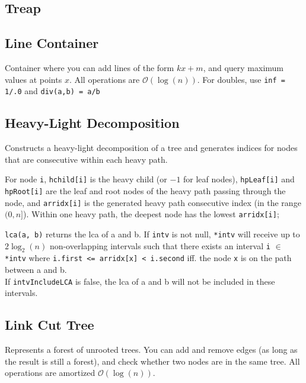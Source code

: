 \documentclass{article}
\begin{document}
\subsection*{Treap}


\subsection*{Line Container}
Container where you can add lines of the form $kx + m$, and query maximum values at points $x$.
All operations are $\mathcal{O}(\log(n))$. For doubles, use \lstinline{inf = 1/.0} and \lstinline{div(a,b) = a/b}


\newpage

\subsection*{Heavy-Light Decomposition}
Constructs a heavy-light decomposition of a tree and generates indices for nodes that are consecutive within each heavy path.

For node \lstinline{i}, \lstinline{hchild[i]} is the heavy child (or $-1$ for leaf nodes),
\lstinline{hpLeaf[i]} and \lstinline{hpRoot[i]} are the leaf and root nodes of the heavy path passing through the node,
and \lstinline{arridx[i]} is the generated heavy path consecutive index (in the range $(0,n]$).
Within one heavy path, the deepest node has the lowest \lstinline{arridx[i]};

\lstinline{lca(a, b)} returns the lca of a and b.
If \lstinline{intv} is not null, \lstinline{*intv} will receive up to $2\log_2(n)$ non-overlapping intervals
such that there exists an interval \lstinline{i} $\in$ \lstinline{*intv} where \lstinline{i.first <= arridx[x] < i.second} iff. the node \lstinline{x} is on the path between a and b.\\
If \lstinline{intvIncludeLCA} is false, the lca of a and b will not be included in these intervals.


\pagebreak

\subsection*{Link Cut Tree}
Represents a forest of unrooted trees. You can add and remove edges (as long as the result is still a forest), and check whether two nodes are in the same tree.
All operations are amortized $\mathcal{O}(\log(n))$.

\end{document}
